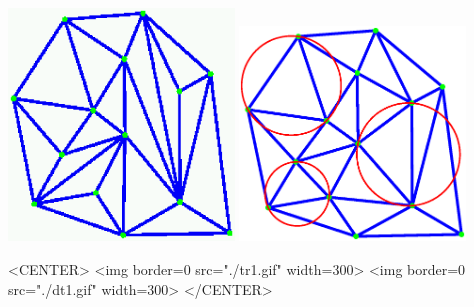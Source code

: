 \newcommand{\triangulationcomment}[1]{}



\begin{ccTexOnly}
\begin{center}
\includegraphics[width=6cm]{tr1.ps} \hspace*{1cm} 
\includegraphics[width=6cm]{dt1.ps} 
\end{center}
\end{ccTexOnly}
\begin{ccHtmlOnly}
<CENTER>
<img border=0 src="./tr1.gif" width=300>
<img border=0 src="./dt1.gif" width=300>
</CENTER>
\end{ccHtmlOnly}

